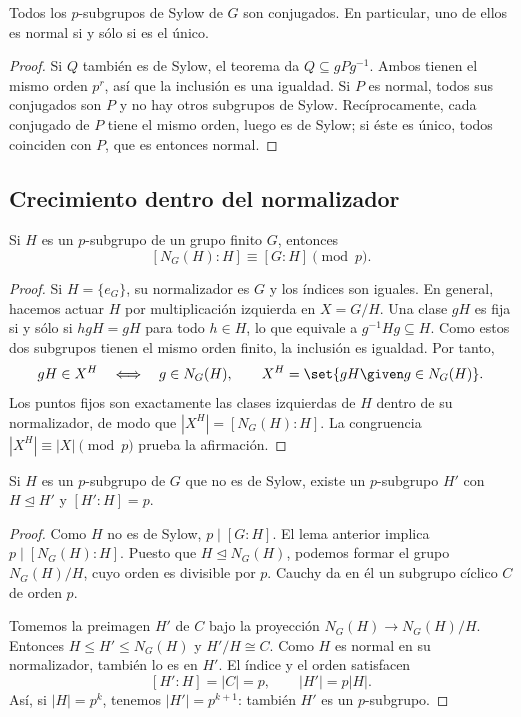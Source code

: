 \begin{coro}\label{coro:C7-conjugados}
Todos los $p$-subgrupos de Sylow de $G$ son conjugados. En particular, uno de ellos es normal si y sólo si es el único.
\end{coro}
\begin{proof}
Si $Q$ también es de Sylow, el teorema da $Q\subseteq gPg^{-1}$. Ambos tienen el mismo orden $p^r$, así que la inclusión es una igualdad. Si $P$ es normal, todos sus conjugados son $P$ y no hay otros subgrupos de Sylow. Recíprocamente, cada conjugado de $P$ tiene el mismo orden, luego es de Sylow; si éste es único, todos coinciden con $P$, que es entonces normal.
\end{proof}

\subsection{Crecimiento dentro del normalizador}
\begin{lema}\label{lema:C7-normalizador}
Si $H$ es un $p$-subgrupo de un grupo finito $G$, entonces
\[
[N_G(H):H]\equiv[G:H]\pmod p.
\]
\end{lema}
\begin{proof}
Si $H=\{e_G\}$, su normalizador es $G$ y los índices son iguales. En general, hacemos actuar $H$ por multiplicación izquierda en $X=G/H$. Una clase $gH$ es fija si y sólo si $hgH=gH$ para todo $h\in H$, lo que equivale a $g^{-1}Hg\subseteq H$. Como estos dos subgrupos tienen el mismo orden finito, la inclusión es igualdad. Por tanto,
\[
gH\in X^H\quad\Longleftrightarrow\quad g\in N_G(H),\qquad
X^H=\set{gH\given g\in N_G(H)}.
\]
Los puntos fijos son exactamente las clases izquierdas de $H$ dentro de su normalizador, de modo que $|X^H|=[N_G(H):H]$. La congruencia $|X^H|\equiv|X|\pmod p$ prueba la afirmación.
\end{proof}

\begin{prop}\label{prop:C7-crecimiento}
Si $H$ es un $p$-subgrupo de $G$ que no es de Sylow, existe un $p$-subgrupo $H'$ con $H\trianglelefteq H'$ y $[H':H]=p$.
\end{prop}
\begin{proof}
Como $H$ no es de Sylow, $p\mid[G:H]$. El lema anterior implica $p\mid[N_G(H):H]$. Puesto que $H\trianglelefteq N_G(H)$, podemos formar el grupo $N_G(H)/H$, cuyo orden es divisible por $p$. Cauchy da en él un subgrupo cíclico $C$ de orden $p$.

Tomemos la preimagen $H'$ de $C$ bajo la proyección $N_G(H)\to N_G(H)/H$. Entonces $H\le H'\le N_G(H)$ y $H'/H\cong C$. Como $H$ es normal en su normalizador, también lo es en $H'$. El índice y el orden satisfacen
\[
[H':H]=|C|=p,\qquad |H'|=p|H|.
\]
Así, si $|H|=p^k$, tenemos $|H'|=p^{k+1}$: también $H'$ es un $p$-subgrupo.
\end{proof}


